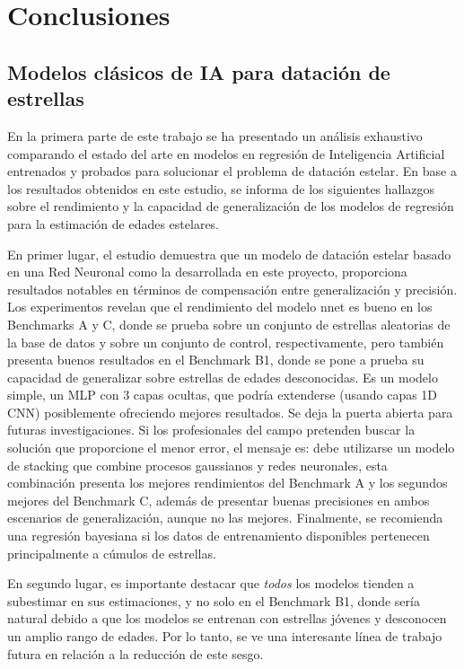 \chapter{Conclusiones}

\section{Modelos clásicos de IA para datación de estrellas}

En la primera parte de este trabajo se ha presentado un análisis exhaustivo comparando el estado del arte en modelos en regresión de Inteligencia Artificial entrenados y probados para solucionar el problema de datación estelar. En base a los resultados obtenidos en este estudio, se informa de los siguientes hallazgos sobre el rendimiento y la capacidad de generalización de los modelos de regresión para la estimación de edades estelares.

En primer lugar, el estudio demuestra que un modelo de datación estelar basado en una Red Neuronal como la desarrollada en este proyecto, proporciona resultados notables en términos de compensación entre generalización y precisión. Los experimentos revelan que el rendimiento del modelo nnet es bueno en los Benchmarks A y C, donde se prueba sobre un conjunto de estrellas aleatorias de la base de datos y sobre un conjunto de control, respectivamente, pero también presenta buenos resultados en el Benchmark B1, donde se pone a prueba su capacidad de generalizar sobre estrellas de edades desconocidas. Es un modelo simple, un MLP con 3 capas ocultas, que podría extenderse (usando capas 1D CNN) posiblemente ofreciendo mejores resultados. Se deja la puerta abierta para futuras investigaciones. Si los profesionales del campo pretenden buscar la solución que proporcione el menor error, el mensaje es: debe utilizarse un modelo de stacking que combine procesos gaussianos y redes neuronales, esta combinación presenta los mejores rendimientos del Benchmark A y los segundos mejores del Benchmark C, además de presentar buenas precisiones en ambos escenarios de generalización, aunque no las mejores. Finalmente, se recomienda una regresión bayesiana si los datos de entrenamiento disponibles pertenecen principalmente a cúmulos de estrellas.

En segundo lugar, es importante destacar que \emph{todos} los modelos tienden a subestimar en sus estimaciones, y no solo en el Benchmark B1, donde sería natural debido a que los modelos se entrenan con estrellas jóvenes y desconocen un amplio rango de edades. Por lo tanto, se ve una interesante línea de trabajo futura en relación a la reducción de este sesgo.

